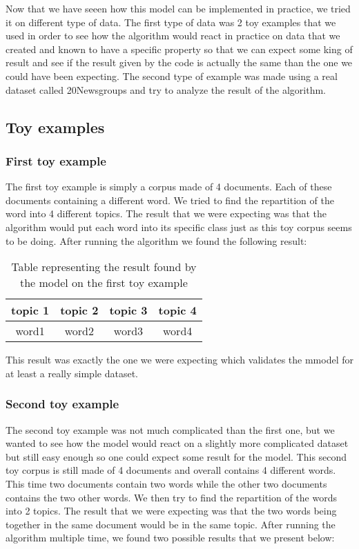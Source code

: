 Now that we have seeen how this model can be implemented in practice, we tried it on different type of data. The first type of data was 2 toy examples that we used in order to see how the algorithm would react in practice on data that we created and known to have a specific property so that we can expect some king of result and see if the result given by the code is actually the same than the one we could have been expecting. The second type of example was made using a real dataset called 20Newsgroups and try to analyze the result of the algorithm.

\subsection{Toy examples}

\subsubsection{First toy example}

The first toy example is simply a corpus made of 4 documents. Each of these documents containing a different word. We tried to find the repartition of the word into 4 different topics. The result that we were expecting was that the algorithm would put each word into its specific class just as this toy corpus seems to be doing. After running the algorithm we found the following result:

\begin{table}[ht]
	\centering
\begin{tabular}{c|c|c|c}
topic 1& topic 2& topic 3 & topic 4\\
\hline
word1	    & word2   &  word3          & word4\\
\end{tabular}
\caption{Table representing the result found by the model on the first toy example}
\label{tab1}
\end{table}

This result was exactly the one we were expecting which validates the mmodel for at least a really simple dataset.


\subsubsection{Second toy example}

The second toy example was not much complicated than the first one, but we wanted to see how the model would react on a slightly more complicated dataset but still easy enough so one could expect some result for the model. This second toy corpus is still made of 4 documents and overall contains 4 different words. This time two documents contain two words while the other two documents contains the two other words. We then try to find the repartition of the words into 2 topics. The result that we were expecting was that the two words being together in the same document would be in the same topic. After running the algorithm multiple time, we found two possible results that we present below:


